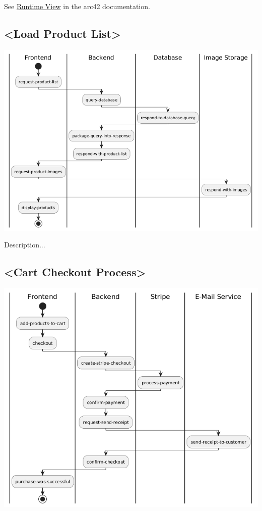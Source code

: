See \href{https://docs.arc42.org/section-6/}{Runtime View} in the arc42
documentation.

\hypertarget{__runtime_scenario_1}{%
\subsection{\textless Load Product List\textgreater{}}\label{__runtime_scenario_1}}
\includegraphics{images/uml_swimlane_product_list.png}

Description...


\hypertarget{__runtime_scenario_2}{%
\subsection{\textless Cart Checkout Process\textgreater{}}\label{__runtime_scenario_2}}
\includegraphics{images/uml_swimlane_checkout.png}


